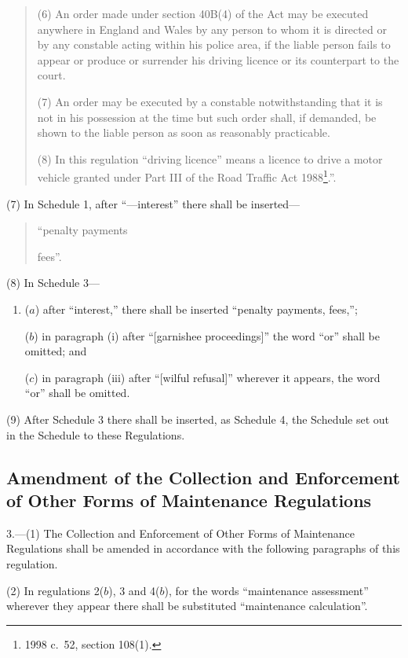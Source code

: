 \documentclass[12pt,a4paper]{article}
\begin{document}
\begin{enumerate}
\begin{quotation}
(6) An order made under section 40B(4) of the Act may be executed anywhere in England and Wales by any person to whom it is directed or by any constable acting within his police area, if the liable person fails to appear or produce or surrender his driving licence or its counterpart to the court.

(7) An order may be executed by a constable notwithstanding that it is not in his possession at the time but such order shall, if demanded, be shown to the liable person as soon as reasonably practicable.

(8) In this regulation “driving licence” means a licence to drive a motor vehicle granted under Part III of the Road Traffic Act 1988\footnote{1998 c.\ 52, section 108(1).}.”.
\end{quotation}
\end{enumerate}

(7) In Schedule 1, after “—interest” there shall be inserted—
\begin{quotation}
    “penalty payments

    fees”. 
\end{quotation}

(8) In Schedule 3—
\begin{enumerate}\item[]
($a$) after “interest,” there shall be inserted “penalty payments, fees,”;

($b$) in paragraph (i)  after “[garnishee proceedings]” the word “or” shall be omitted; and

($c$) in paragraph (iii)  after “[wilful refusal]” wherever it appears, the word “or” shall be omitted.
\end{enumerate}

(9) After Schedule 3 there shall be inserted, as Schedule 4, the Schedule set out in the Schedule to these Regulations.

\subsection[3. Amendment of the Collection and Enforcement of Other Forms of Maintenance Regulations]{\sloppy Amendment of the Collection and Enforcement of Other Forms of Maintenance Regulations}

3.---(1)  The Collection and Enforcement of Other Forms of Maintenance Regulations shall be amended in accordance with the following paragraphs of this regulation.

(2) In regulations 2($b$), 3 and 4($b$), for the words “maintenance assessment” wherever they appear there shall be substituted “maintenance calculation”.
\end{document}
